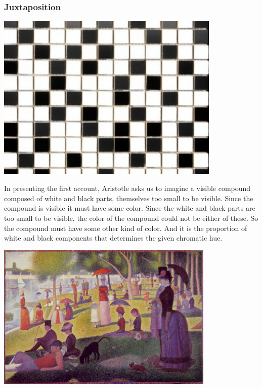 \begin{frame}[t]\frametitle{Juxtaposition}
	\begin{center}
		\includegraphics[height=8cm]{../../graphics/black_white_tile.jpg}
	\end{center}
\end{frame}

In presenting the first account, Aristotle asks us to imagine a visible compound composed of white and black parts, themselves too small to be visible. Since the compound is visible it must have some color. Since the white and black parts are too small to be visible, the color of the compound could not be either of these. So the compound must have some other kind of color. And it is the proportion of white and black components that determines the given chromatic hue. \change

\begin{frame}
	\begin{center}
		\includegraphics[height=7cm]{../../graphics/jatte.jpg}
	\end{center}
\end{frame}

